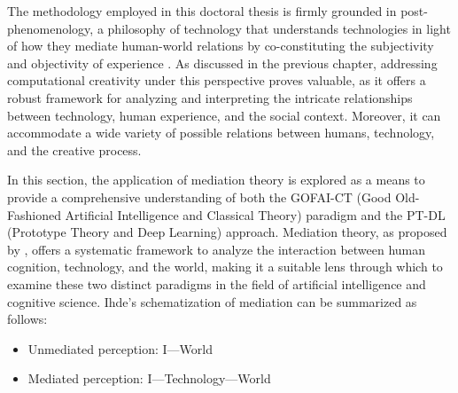 The methodology employed in this doctoral thesis is firmly grounded in post-phenomenology, a philosophy of technology that understands technologies in light of how they mediate human-world relations by co-constituting the subjectivity and objectivity of experience \citep{Rosenberger2015}. As discussed in the previous chapter, addressing computational creativity under this perspective proves valuable, as it offers a robust framework for analyzing and interpreting the intricate relationships between technology, human experience, and the social context. Moreover, it can accommodate a wide variety of possible relations between humans, technology, and the creative process. 

In this section, the application of mediation theory is explored as a means to provide a comprehensive understanding of both the GOFAI-CT (Good Old-Fashioned Artificial Intelligence and Classical Theory) paradigm and the PT-DL (Prototype Theory and Deep Learning) approach. Mediation theory, as proposed by \cite{Ihde1990}, offers a systematic framework to analyze the interaction between human cognition, technology, and the world, making it a suitable lens through which to examine these two distinct paradigms in the field of artificial intelligence and cognitive science. Ihde's schematization of mediation can be summarized as follows:
 \begin{itemize}
 	\singlespacing
 	\item Unmediated perception: I---World
 	\item Mediated perception: I---Technology---World
 \end{itemize}

